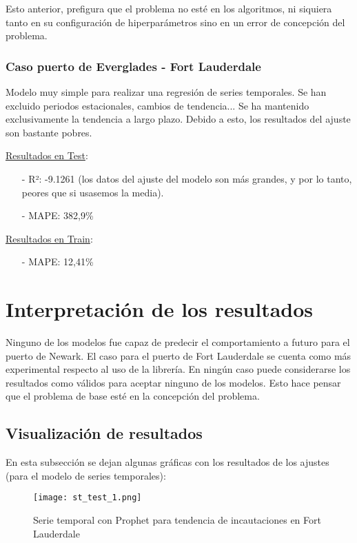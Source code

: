 \documentclass[12pt]{article}
\begin{document}
	Esto anterior, prefigura que el problema no esté en los algoritmos, ni siquiera tanto en su configuración de hiperparámetros sino en un error de concepción del problema.
	
	\subsubsection{\label{evalFL} Caso puerto de Everglades - Fort Lauderdale}
	Modelo muy simple para realizar una regresión de series temporales. Se han excluido periodos estacionales, cambios de tendencia... Se ha mantenido exclusivamente la tendencia a largo plazo. Debido a esto, los resultados del ajuste son bastante pobres.
	
	\underline{Resultados en Test}: \\
	\begin{itemize}
		\item[-] R²: -9.1261 (los datos del ajuste del modelo son más grandes, y por lo tanto, peores que si usasemos la media).
		\item[-] MAPE: 382,9\%
	\end{itemize}

	\underline{Resultados en Train}: \\
	\begin{itemize}
		\item[-] MAPE: 12,41\%
	\end{itemize}
	
	

\newpage
\section{\label{interpretacion}Interpretación de los resultados}
Ninguno de los modelos fue capaz de predecir el comportamiento a futuro para el puerto de Newark. El caso para el puerto de Fort Lauderdale se cuenta como más experimental respecto al uso de la librería. En ningún caso puede considerarse los resultados como válidos para aceptar ninguno de los modelos. Esto hace pensar que el problema de base esté en la concepción del problema.

	\subsection{Visualización de resultados}
	En esta subsección se dejan algunas gráficas con los resultados de los ajustes (para el modelo de series temporales):
	
	\begin{figure}[H]
		\caption{\label{st_test_1} Serie temporal con Prophet para tendencia de incautaciones en Fort Lauderdale}
		\centering
		\hspace*{1cm}
		\texttt{[image: st\_test\_1.png]}
	\end{figure}
\end{document}
